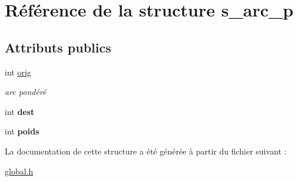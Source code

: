 \hypertarget{structs__arc__p}{}\section{Référence de la structure s\+\_\+arc\+\_\+p}
\label{structs__arc__p}
\subsection*{Attributs publics}
\begin{DoxyCompactItemize}
\item 
\mbox{\label{structs__arc__p_a7e29f3e22b1f325c3f34750c98b6f3a4}} 
int \hyperlink{structs__arc__p_a7e29f3e22b1f325c3f34750c98b6f3a4}{orig}
\begin{DoxyCompactList}\small\item\em arc pondéré \end{DoxyCompactList}\item 
\mbox{\label{structs__arc__p_ad5ac3f6e18353eae50ec9d72bd3d4224}} 
int {\bfseries dest}
\item 
\mbox{\label{structs__arc__p_abc56609c28f29ed0742e8790d38e4b0f}} 
int {\bfseries poids}
\end{DoxyCompactItemize}


La documentation de cette structure a été générée à partir du fichier suivant \+:\begin{DoxyCompactItemize}
\item 
\hyperlink{global_8h}{global.\+h}\end{DoxyCompactItemize}
